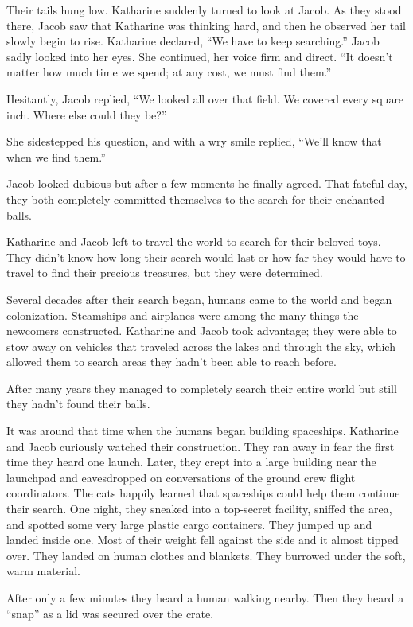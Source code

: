 Their tails hung low. Katharine suddenly turned to look at Jacob. As they stood there, Jacob saw that Katharine was thinking hard, and then he observed her tail slowly begin to rise. Katharine declared, “We have to keep searching.” Jacob sadly looked into her eyes. She continued, her voice firm and direct. “It doesn't matter how much time we spend; at any cost, we must find them.”

Hesitantly, Jacob replied, “We looked all over that field. We covered every square inch. Where else could they be?”

She sidestepped his question, and with a wry smile replied, “We'll know that when we find them.”

Jacob looked dubious but after a few moments he finally agreed. That fateful day, they both completely committed themselves to the search for their enchanted balls.

\timesep

Katharine and Jacob left to travel the world to search for their beloved toys. They didn't know how long their search would last or how far they would have to travel to find their precious treasures, but they were determined.

Several decades after their search began, humans came to the world and began colonization. Steamships and airplanes were among the many things the newcomers constructed. Katharine and Jacob took advantage; they were able to stow away on vehicles that traveled across the lakes and through the sky, which allowed them to search areas they hadn't been able to reach before.

After many years they managed to completely search their entire world but still they hadn't found their balls.

It was around that time when the humans began building spaceships. Katharine and Jacob curiously watched their construction. They ran away in fear the first time they heard one launch. Later, they crept into a large building near the launchpad and eavesdropped on conversations of the ground crew flight coordinators. The cats happily learned that spaceships could help them continue their search. One night, they sneaked into a top-secret facility, sniffed the area, and spotted some very large plastic cargo containers. They jumped up and landed inside one. Most of their weight fell against the side and it almost tipped over. They landed on human clothes and blankets. They burrowed under the soft, warm material.

After only a few minutes they heard a human walking nearby. Then they heard a “snap” as a lid was secured over the crate.

